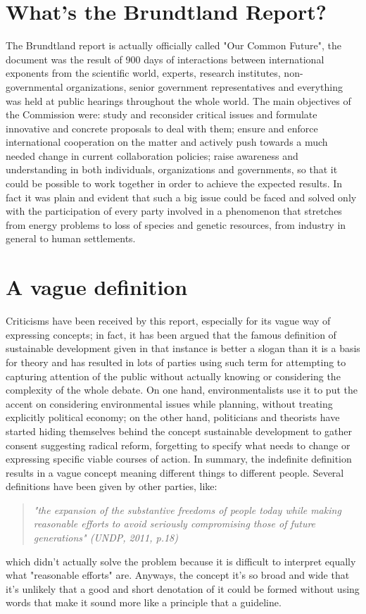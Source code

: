 \documentclass[11pt]{article} %
\begin{document}
\section{What's the Brundtland Report?}
The Brundtland report is actually officially called "Our Common Future", the document was the result of 900 days of interactions between international exponents from the scientific world, experts, research institutes, non-governmental organizations, senior government representatives and everything was held at public hearings throughout the whole world. The main objectives of the Commission were: study and reconsider critical issues and formulate innovative and concrete proposals to deal with them; ensure and enforce international cooperation on the matter and actively push towards a much needed change in current collaboration policies; raise awareness and understanding in both individuals, organizations and governments, so that it could be possible to work together in order to achieve the expected results. In fact it was plain and evident that such a big issue could be faced and solved only with the participation of every party involved in a phenomenon that stretches from energy problems to loss of species and genetic resources, from industry in general to human settlements.

\section{A vague definition}
Criticisms have been received by this report, especially for its vague way of expressing concepts; in fact, it has been argued that the famous definition of sustainable development given in that instance is better a slogan than it is a basis for theory and has resulted in lots of parties using such term for attempting to capturing attention of the public without actually knowing or considering the complexity of the whole debate. On one hand, environmentalists use it to put the accent on considering environmental issues while planning, without treating explicitly political economy; on the other hand, politicians and theorists have started hiding themselves behind the concept sustainable development to gather consent suggesting radical reform, forgetting to specify what needs to change or expressing specific viable courses of action. In summary, the indefinite definition results in a vague concept meaning different things to different people. Several definitions have been given by other parties, like: \begin{quote}
\em"the expansion of the substantive freedoms of people today while making reasonable efforts to avoid seriously compromising those of future generations" (UNDP, 2011, p.18)\end{quote}
which didn't actually solve the problem because it is difficult to interpret equally what "reasonable efforts" are. Anyways, the concept it's so broad and wide that it's unlikely that a good and short denotation of it could be formed without using words that make it sound more like a principle that a guideline.
\end{document}
